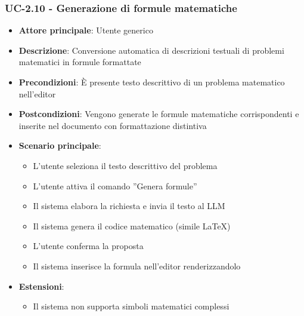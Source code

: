 \documentclass[11pt,a4paper]{article}
\begin{document}
\subsubsection{UC-2.10 - Generazione di formule matematiche}
\begin{itemize}
    \item \textbf{Attore principale}: Utente generico
    \item \textbf{Descrizione}: Conversione automatica di descrizioni testuali di problemi matematici in formule formattate
    \item \textbf{Precondizioni}: È presente testo descrittivo di un problema matematico nell’editor
    \item \textbf{Postcondizioni}: Vengono generate le formule matematiche corrispondenti e inserite nel documento con formattazione distintiva
    \item \textbf{Scenario principale}:
    \begin{itemize}
    \item L’utente seleziona il testo descrittivo del problema
    \item L’utente attiva il comando ”Genera formule”
    \item Il sistema elabora la richiesta e invia il testo al LLM
    \item Il sistema genera il codice matematico (simile LaTeX) 
    \item L'utente conferma la proposta
    \item Il sistema inserisce la formula nell'editor renderizzandolo
    \end{itemize}
    \item \textbf{Estensioni}:
    \begin{itemize}
        \item Il sistema non supporta simboli matematici complessi
    \end{itemize}
\end{itemize}
\end{document}
